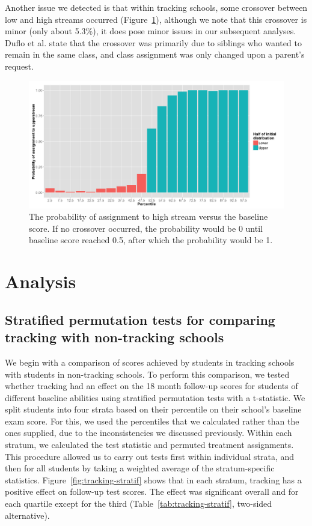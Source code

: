\documentclass[11pt]{article}
\begin{document}
Another issue we detected is that within tracking schools, some crossover between low and high streams occurred (Figure~\ref{fig:crossover}), although we note that this crossover is minor (only about 5.3\%), it does pose minor issues in our subsequent analyses. Duflo et al. state that the crossover was primarily due to siblings who wanted to remain in the same class, and class assignment was only changed upon a parent's request.

 
 

 
  
  \begin{figure}[ht]
 \centering
 \includegraphics[scale=0.4]{tmt_assignment.png}
 \caption{The probability of assignment to high stream versus the baseline score. If no crossover occurred, the probability would be 0 until baseline score reached 0.5, after which the probability would be 1.}
 \label{fig:crossover}
 \end{figure} 
 
 
 \section{Analysis}


 \subsection{Stratified permutation tests for comparing tracking with non-tracking schools}

We begin with a comparison of scores achieved by students in tracking schools with students in non-tracking schools. To perform this comparison, we tested whether tracking had an effect on the 18 month follow-up scores for students of different baseline abilities using stratified permutation tests with a t-statistic. We split students into four strata based on their percentile on their school's baseline exam score.  For this, we used the percentiles that we calculated rather than the ones supplied, due to the inconsistencies we discussed previously.  Within each stratum, we calculated the test statistic and permuted treatment assignments.  This procedure allowed us to carry out tests first within individual strata, and then for all students by taking a weighted average of the stratum-specific statistics.  Figure~\ref{fig:tracking-stratif} shows that in each stratum, tracking has a positive effect on follow-up test scores.  The effect was significant overall and for each quartile except for the third (Table~\ref{tab:tracking-stratif}, two-sided alternative). \\
\end{document}
